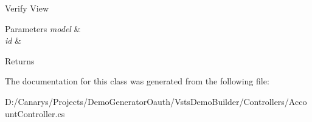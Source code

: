 Verify View 


\begin{DoxyParams}{Parameters}
{\em model} & \\
\hline
{\em id} & \\
\hline
\end{DoxyParams}
\begin{DoxyReturn}{Returns}

\end{DoxyReturn}


The documentation for this class was generated from the following file\+:\begin{DoxyCompactItemize}
\item 
D\+:/\+Canarys/\+Projects/\+Demo\+Generator\+Oauth/\+Vsts\+Demo\+Builder/\+Controllers/Account\+Controller.\+cs\end{DoxyCompactItemize}
